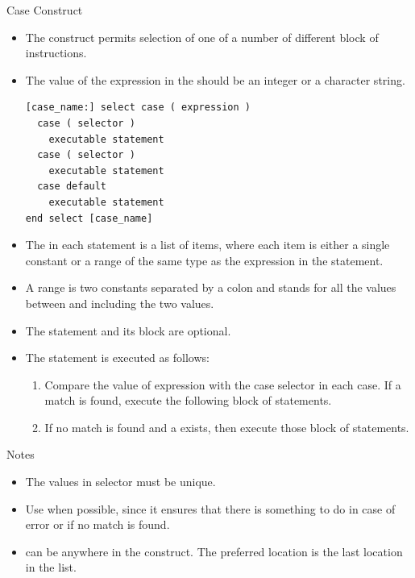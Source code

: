\documentclass[10pt,t]{beamer}
\begin{document}
\begin{frame}{Case Construct}
  \begin{itemize}
    \item The  construct permits selection of one of a number of different block of instructions.
    \item The value of the expression in the  should be an integer or a character string.
      \begin{lstlisting}[language={[90]Fortran},basicstyle=\fontsize{6}{7}\selectfont\ttfamily]
[case_name:] select case ( expression )
  case ( selector )
    executable statement
  case ( selector )
    executable statement
  case default
    executable statement
end select [case_name]
      \end{lstlisting}
    \item The  in each  statement is a list of items, where each item is either a single constant or a range of the same type as the expression in the  statement.
    \item A range is two constants separated by a colon and stands for all the values between and including the two values. 
    \item The  statement and its block are optional.
    \item The  statement is executed as follows:
    \begin{enumerate}
      \item Compare the value of expression with the case selector in each case. If a match is found, execute the following block of statements.
      \item If no match is found and a  exists, then execute those block of statements.
    \end{enumerate}
  \end{itemize}
  \begin{ablock}{Notes}
    \begin{itemize}
      \item The values in selector must be unique.
      \item Use  when possible, since it ensures that there is something to do in case of error or if no match is found.
      \item {} can be anywhere in the  construct. The preferred location is the last location in the  list.

\end{itemize}
\end{ablock}
\end{frame}
\end{document}
